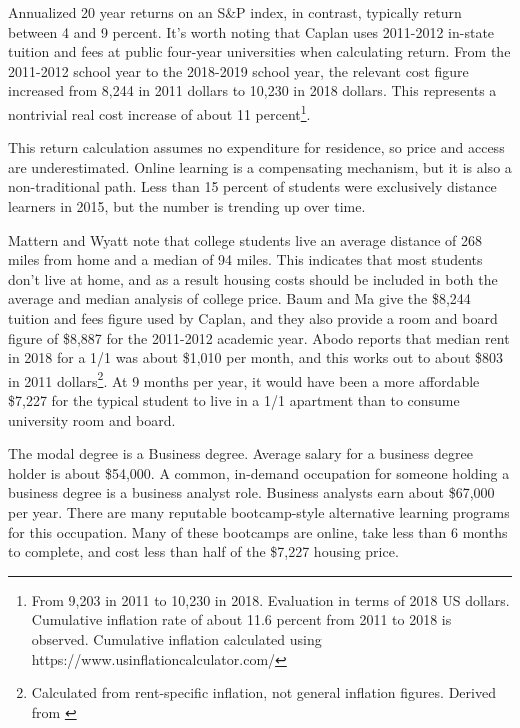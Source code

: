 \documentclass[AER]{./aea-latex-templates/AEA}
\begin{document}
        Annualized 20 year returns on an S\&P index, in contrast, typically
        return between 4 and 9 percent\cite{isbitts_2018}. It’s worth noting that Caplan uses 2011-2012
        in-state tuition and fees at public four-year universities when
        calculating return. From the 2011-2012 school year to the 2018-2019 school
        year, the relevant cost figure increased from 8,244 in 2011 dollars to
        10,230 in 2018 dollars\cite{collegeboard2018fiveyearchange}. This represents
        a nontrivial real cost increase of about 11 percent\footnote{From 9,203
        in 2011 to 10,230 in 2018. Evaluation in terms of 2018 US dollars. Cumulative
        inflation rate of about 11.6 percent from 2011 to 2018 is observed.
        Cumulative inflation calculated using https://www.usinflationcalculator.com/}.
        
        This return calculation assumes no expenditure for residence, so price
        and access are underestimated. Online learning is a compensating
        mechanism, but it is also a non-traditional path. Less than
        15 percent of students were exclusively distance
        learners\cite{nces2016percentexclusivelydistance} in 2015, but the
        number is trending up over time.
        
        Mattern and Wyatt\cite{mattern2009student} note that college students live an average distance of
        268 miles from home and a median of 94 miles. This indicates that most
        students don’t live at home, and as a result housing costs should be
        included in both the average and median analysis of college price. Baum
        and Ma give the \$8,244 tuition and fees figure used by Caplan, and they
        also provide a room and board figure of \$8,887 for the 2011-2012 academic
        year. Abodo reports that median rent in 2018 for a 1/1 was about \$1,010
        per month\cite{abodo_2019}, and this works out to about \$803 in 2011
        dollars\footnote{Calculated from rent-specific inflation, not general inflation
        figures. Derived from \cite{alioth2019}}. At 9 months
        per year, it would have been a more affordable \$7,227 for the typical
        student to live in a 1/1 apartment than to consume university room and
        board.
        
        The modal degree is a Business degree. Average salary for a business
        degree holder is about \$54,000\cite{adams2013college}. A common,
        in-demand occupation for someone holding a business degree is a business
        analyst role. Business analysts earn about \$67,000 per year. There
        are many reputable bootcamp-style alternative learning programs for this
        occupation\cite{white_2018}. Many of these bootcamps are online, take less than 6 months
        to complete, and cost less than half of the \$7,227 housing price.
        
\end{document}
